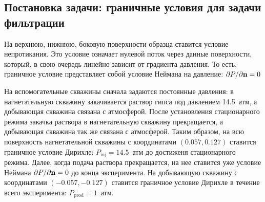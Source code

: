 \subsection{Постановка задачи: граничные условия для задачи фильтрации}

На верхнюю, нижнюю, боковую поверхности образца ставится условие непротикания. Это условие означает нулевой поток через данные поверхности, который, в свою очередь линейно зависит от градиента давления. То есть, граничное условие представляет собой условие Неймана на давление: $ \partial P/\partial\mathbf{n} = 0$

На вспомогательные скважины сначала задаются постоянные давления: в нагнетательную скважину закачивается раствор гипса под давлением 14.5~атм, а добывающая скважина связана с атмосферой. После установления стационарного режима закачка раствора в нагнетательную скважину прекращается, а добывающая скважина так же связана с атмосферой. Таким образом, на всю поверхность нагнетательной скважины с координатами  $(0.057, 0.127)$ ставится граничное условие Дирихле: $P_\text{inj}=14.5$~атм до достиженя стационарного режима. Далее, когда подача раствора прекращается, на нее ставится уже условие Неймана  $ \partial P/\partial\mathbf{n} = 0$ до конца эксперимента. На добывающую скважину с координатами  $(-0.057, -0.127)$ ставится граничное условие Дирихле в течение всего эксперимента: $P_\text{prod}=1$~атм.
